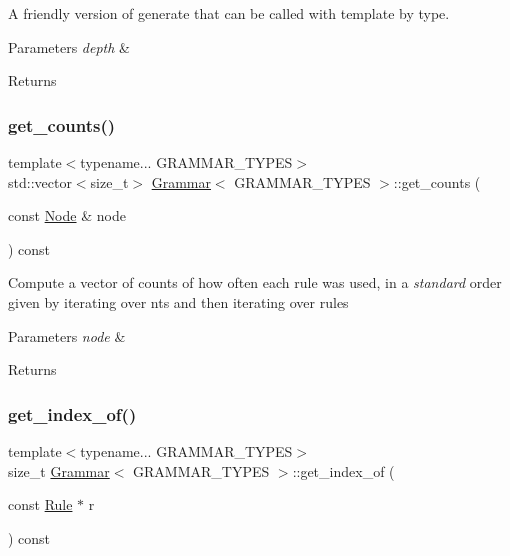 A friendly version of generate that can be called with template by type. 
\begin{DoxyParams}{Parameters}
{\em depth} & \\
\hline
\end{DoxyParams}
\begin{DoxyReturn}{Returns}

\end{DoxyReturn}
\mbox{\label{class_grammar_a1e192e96e623cf9beb927cbd35bd7470}} 
\subsubsection{\texorpdfstring{get\+\_\+counts()}{get\_counts()}}
{\footnotesize\ttfamily template$<$typename... G\+R\+A\+M\+M\+A\+R\+\_\+\+T\+Y\+P\+ES$>$ \\
std\+::vector$<$size\+\_\+t$>$ \hyperlink{class_grammar}{Grammar}$<$ G\+R\+A\+M\+M\+A\+R\+\_\+\+T\+Y\+P\+ES $>$\+::get\+\_\+counts (\begin{DoxyParamCaption}\item[{const \hyperlink{class_node}{Node} \&}]{node }\end{DoxyParamCaption}) const\hspace{0.3cm}{\ttfamily [inline]}}

Compute a vector of counts of how often each rule was used, in a {\itshape standard} order given by iterating over nts and then iterating over rules 
\begin{DoxyParams}{Parameters}
{\em node} & \\
\hline
\end{DoxyParams}
\begin{DoxyReturn}{Returns}

\end{DoxyReturn}
\mbox{\label{class_grammar_a16885c3de4a6e3fd31ddab136cd9fea8}} 
\subsubsection{\texorpdfstring{get\+\_\+index\+\_\+of()}{get\_index\_of()}}
{\footnotesize\ttfamily template$<$typename... G\+R\+A\+M\+M\+A\+R\+\_\+\+T\+Y\+P\+ES$>$ \\
size\+\_\+t \hyperlink{class_grammar}{Grammar}$<$ G\+R\+A\+M\+M\+A\+R\+\_\+\+T\+Y\+P\+ES $>$\+::get\+\_\+index\+\_\+of (\begin{DoxyParamCaption}\item[{const \hyperlink{class_rule}{Rule} $\ast$}]{r }\end{DoxyParamCaption}) const\hspace{0.3cm}{\ttfamily [inline]}}

